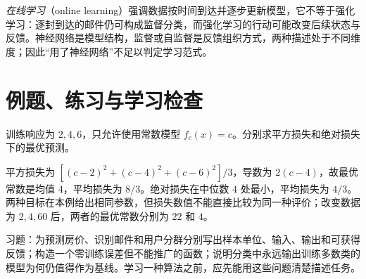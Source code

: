 \emph{在线学习}（online learning）强调数据按时间到达并逐步更新模型，它不等于强化学习：逐封到达的邮件仍可构成监督分类，而强化学习的行动可能改变后续状态与反馈。神经网络是模型结构，监督或自监督是反馈组织方式，两种描述处于不同维度；因此“用了神经网络”不足以判定学习范式。

\section{例题、练习与学习检查}

\begin{example}[常数预测与学习目标]
训练响应为 $2,4,6$，只允许使用常数模型 $f_c(x)=c$。分别求平方损失和绝对损失下的最优预测。
\end{example}
\begin{solve}
平方损失为 $[(c-2)^2+(c-4)^2+(c-6)^2]/3$，导数为 $2(c-4)$，故最优常数是均值 $4$，平均损失为 $8/3$。绝对损失在中位数 $4$ 处最小，平均损失为 $4/3$。两种目标在本例给出相同参数，但损失数值不能直接比较为同一种评价；改变数据为 $2,4,60$ 后，两者的最优常数分别为 $22$ 和 $4$。
\end{solve}

习题：为预测房价、识别邮件和用户分群分别写出样本单位、输入、输出和可获得反馈；构造一个零训练误差但不能推广的函数；说明分类中永远输出训练多数类的模型为何仍值得作为基线。学习一种算法之前，应先能用这些问题清楚描述任务。





